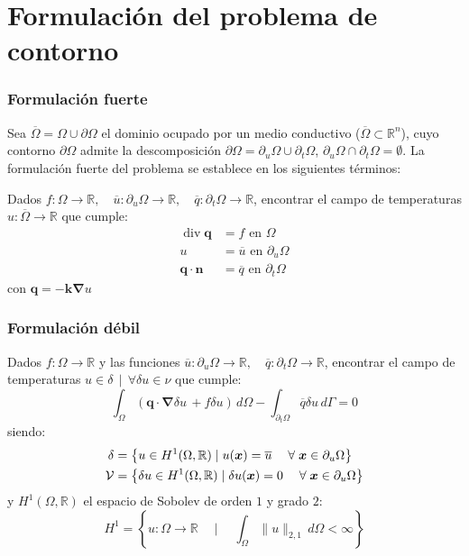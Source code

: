 \documentclass[handout]{beamer}
\newcommand{\norm}[1]{\lVert #1 \rVert}
\begin{document}
\section{Formulación del problema de contorno}
\begin{frame}
\frametitle{Formulación fuerte}

Sea $\overline{\Omega}=\Omega \cup \partial \Omega$ el dominio ocupado
por un medio conductivo ($\overline{\Omega} \subset \mathbb{R}^n$), cuyo
contorno $\partial \Omega$ admite la descomposición
$\partial \Omega=\partial_u \Omega \cup \partial_t \Omega$,
$\partial_u \Omega \cap \partial_t \Omega= \emptyset$. La formulación fuerte
del problema se establece en los siguientes términos:

Dados $f:\Omega \rightarrow \mathbb{R},\quad
\overline{u} :\partial_u \Omega \rightarrow \mathbb{R}, \quad
\overline{q} :\partial_t \Omega \rightarrow \mathbb{R}$, encontrar el
campo de temperaturas $u:\overline{\Omega}\rightarrow \mathbb{R}$ que
cumple:
\begin{align}
\operatorname{div} \bm{q}&=f \textrm{ en } \Omega\\
u&=\overline{u} \textrm{ en } \partial_u \Omega \\
\bm{q}\cdot \bm{n} &=\overline{q} \textrm{ en } \partial_t \Omega
\end{align}
con $\bm{q}=-\bm{k} \bm{\nabla} u$
\end{frame}
\begin{frame}
\frametitle{Formulación débil}

Dados $f:\Omega \rightarrow \mathbb{R}$ y las funciones
$\overline{u} :\partial_u \Omega \rightarrow \mathbb{R}, \quad
\overline{q} :\partial_t \Omega \rightarrow \mathbb{R}$, encontrar el
campo de temperaturas $u \in \delta \, \mid \, \forall \delta u \in
\nu$ que cumple:
\begin{equation}
\int_{\Omega} 
\left( \bm{q} \cdot \bm{\nabla} \delta u \, + f \delta u \right) \,
d \Omega - \int_{\partial_t \Omega} \overline{q} \delta u \, d \Gamma=0
\end{equation}
siendo:
\begin{align}
\delta&=\left\{
u \in H^1(\Omega,\mathbb{R}) \mid u(\bm{x})=\overline{u}
\; \quad \forall \; \bm{x} \in \partial_u \Omega \right\} \label{trial} \\
{\cal V}&=\left\{
\delta u \in H^1(\Omega,\mathbb{R}) \mid \delta u(\bm{x})=0
\; \quad \forall \; \bm{x} \in \partial_u \Omega \right\} \label{weight}
\end{align}
y $H^1(\Omega,\mathbb{R})$ el espacio de Sobolev de orden $1$ y grado $2$:
$$
H^1=\left\{ u:\Omega \rightarrow \mathbb{R} \quad \mid \quad
\int_{\Omega} \norm{u}_{2,1} \, d\Omega <\infty \right\}
$$
\end{frame}
\end{document}

